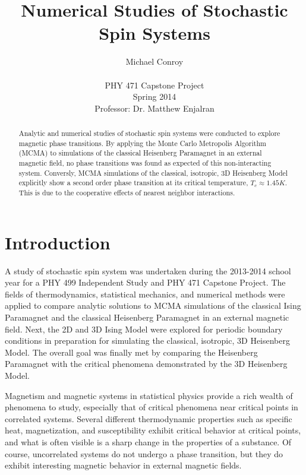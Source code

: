 \documentclass[a4paper,12pt]{article}
\title{Numerical Studies of Stochastic Spin Systems}
\author{Michael Conroy\\
  \\
  PHY 471 Capstone Project \\
  Spring 2014 \\
  Professor: Dr. Matthew Enjalran\\
  \date{}}
\begin{document}
\maketitle

\begin{abstract}
Analytic and numerical studies of stochastic spin systems were conducted to explore magnetic phase transitions. By applying the Monte Carlo Metropolis Algorithm (MCMA) to simulations of the classical Heisenberg Paramagnet in an external magnetic field, no phase transitions was found as expected of this non-interacting system. Conversly, MCMA simulations of the classical, isotropic, 3D Heisenberg Model explicitly show a second order phase transition at its critical temperature, $T_c \approx 1.45 K$. This is due to the cooperative effects of nearest neighbor interactions.
	

\end{abstract}
 
\pagebreak


\pagebreak

\section{Introduction}
A study of stochastic spin system was undertaken during the 2013-2014 school year for a PHY 499 Independent Study and PHY 471 Capstone Project. The fields of thermodynamics, statistical mechanics, and numerical methods were applied to compare analytic solutions to MCMA simulations of the classical Ising Paramagnet and the classical Heisenberg Paramagnet in an external magnetic field. Next, the 2D and 3D Ising Model were explored for periodic boundary conditions in preparation for simulating the classical, isotropic, 3D Heisenberg Model. The overall goal was finally met by comparing the Heisenberg Paramagnet with the critical phenomena demonstrated by the 3D Heisenberg Model.

Magnetism and magnetic systems in statistical physics provide a rich wealth of phenomena to study, especially that of critical phenomena near critical points in correlated systems. Several different thermodynamic properties such as specific heat, magnetization, and susceptibility exhibit critical behavior at critical points, and what is often visible is a sharp change in the properties of a substance. Of course, uncorrelated systems do not undergo a phase transition, but they do exhibit interesting magnetic behavior in external magnetic fields.
\end{document}
